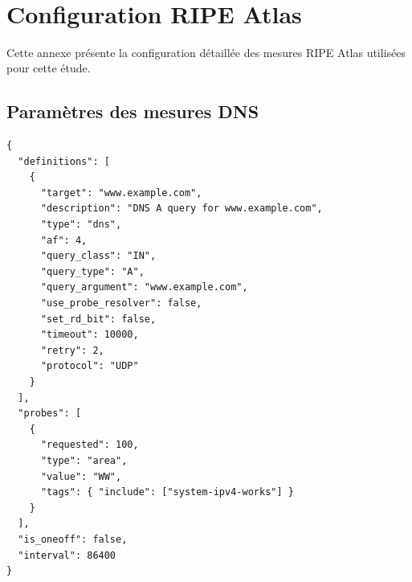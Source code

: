 \documentclass[a4paper,11pt]{book}
\begin{document}
\clearpage\newpage\hbox{ }\clearpage\newpage

\fancyhf{}
\fancyfoot[L]{\nouppercase{\leftmark}}
\fancyfoot[R]{\thepage}
\renewcommand{\headrulewidth}{0pt}
\renewcommand{\footrulewidth}{0.4pt}
\pagestyle{fancy}









\printbibliography[heading=bibintoc,title={Bibliographie}]


\appendix

\chapter{Configuration RIPE Atlas}

Cette annexe présente la configuration détaillée des mesures RIPE Atlas utilisées pour cette étude.

\section{Paramètres des mesures DNS}

\begin{lstlisting}[style=json,caption=Configuration JSON d'une mesure DNS RIPE Atlas]
{
  "definitions": [
    {
      "target": "www.example.com",
      "description": "DNS A query for www.example.com",
      "type": "dns",
      "af": 4,
      "query_class": "IN",
      "query_type": "A",
      "query_argument": "www.example.com",
      "use_probe_resolver": false,
      "set_rd_bit": false,
      "timeout": 10000,
      "retry": 2,
      "protocol": "UDP"
    }
  ],
  "probes": [
    {
      "requested": 100,
      "type": "area",
      "value": "WW",
      "tags": { "include": ["system-ipv4-works"] }
    }
  ],
  "is_oneoff": false,
  "interval": 86400
}
\end{lstlisting}
\end{document}
